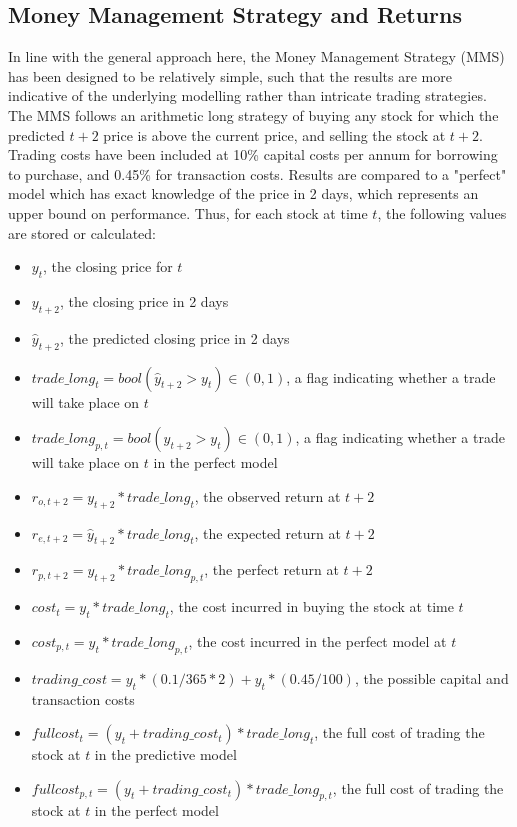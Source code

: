 \documentclass[a4paper,latin]{paper}
\begin{document}
\subsection{Money Management Strategy and Returns}

In line with the general approach here, the Money Management Strategy (MMS) has been designed to be relatively simple, such that the results are more indicative of the underlying modelling rather than intricate trading strategies. The MMS follows an arithmetic long strategy of buying any stock for which the predicted ${t+2}$ price is above the current price, and selling the stock at ${t+2}$. Trading costs have been included at 10\% capital costs per annum for borrowing to purchase, and 0.45\% for transaction costs. Results are compared to a "perfect" model which has exact knowledge of the price in 2 days, which represents an upper bound on performance.
\hfill\break
Thus, for each stock at time $t$, the following values are stored or calculated:

\begin{itemize}
	\item $y_t$, the closing price for $t$
	\item $y_{t+2}$, the closing price in 2 days
	\item $\hat{y}_{t+2}$, the predicted closing price in 2 days
	\item $trade\_long_t = bool(\hat{y}_{t+2} > y_t) \in (0, 1)$, a flag indicating whether a trade will take place on $t$
	\item $trade\_long_{p,t} = bool({y}_{t+2} > y_t) \in (0, 1)$, a flag indicating whether a trade will take place on $t$ in the perfect model
	\newline
	\item $r_{o, t + 2} = y_{t+2} * trade\_long_t$, the observed return at $t+2$
	\item $r_{e, t + 2} = \hat{y}_{t+2} * trade\_long_t$, the expected return at $t+2$
	\item $r_{p, t + 2} = y_{t+2} * trade\_long_{p,t}$, the perfect return at $t+2$
	\newline
	\item $cost_t = y_t * trade\_long_t$, the cost incurred in buying the stock at time $t$
	\item $cost_{p,t} = y_t * trade\_long_{p,t}$, the cost incurred in the perfect model at $t$
	\newline
	\item $trading\_cost= y_t * (0.1 / 365 * 2) + y_t * (0.45 / 100) $, the possible capital and transaction costs
	\item $fullcost_t = (y_t + trading\_cost_t) * trade\_long_t$, the full cost of trading the stock at $t$ in the predictive model
	\item $fullcost_{p,t} = (y_t + trading\_cost_t) * trade\_long_{p, t}$, the full cost of trading the stock at $t$ in the perfect model
\end{itemize}
\end{document}

